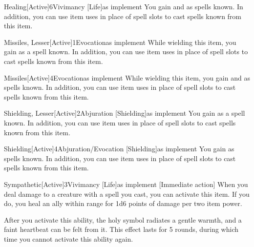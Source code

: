         \begin{magicitemdef}{Healing}[Active]{6}{Vivimancy [Life]}{as implement}
             You gain  and  as spells known.
            In addition, you can use item uses in place of spell slots to cast spells known from this item.
        \end{magicitemdef}

        \begin{magicitemdef}[Arcane]{Missiles, Lesser}[Active]{1}{Evocation}{as implement}
             While wielding this item, you gain  as a spell known.
            In addition, you can use item uses in place of spell slots to cast spells known from this item.
        \end{magicitemdef}

        \begin{magicitemdef}[Arcane]{Missiles}[Active]{4}{Evocation}{as implement}
             While wielding this item, you gain  and  as spells known.
            In addition, you can use item uses in place of spell slots to cast spells known from this item.
        \end{magicitemdef}

        \begin{magicitemdef}{Shielding, Lesser}[Active]{2}{Abjuration [Shielding]}{as implement}
             You gain  as a spell known.
            In addition, you can use item uses in place of spell slots to cast spells known from this item.
        \end{magicitemdef}

        \begin{magicitemdef}{Shielding}[Active]{4}{Abjuration/Evocation [Shielding]}{as implement}
             You gain  as spells known.
            In addition, you can use item uses in place of spell slots to cast spells known from this item.
        \end{magicitemdef}

        \begin{magicitemdef}[Divine]{Sympathetic}[Active]{3}{Vivimancy [Life]}{as implement}
            [Immediate action] When you deal damage to a creature with a spell you cast, you can activate this item.
            If you do, you heal an ally within \rngclose range for 1d6 points of damage per two item power.

            After you activate this ability, the holy symbol radiates a gentle warmth, and a faint heartbeat can be felt from it.
            This effect lasts for 5 rounds, during which time you cannot activate this ability again.
        \end{magicitemdef}


